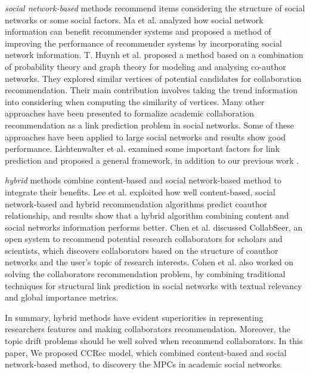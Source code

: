 \documentclass[review]{elsarticle}
\begin{document}
\emph{social network-based} methods recommend items considering the structure of social networks or some social factors. Ma et al. \cite{ma2011recommender} analyzed how social network information can benefit recommender systems and proposed a method of improving the performance of recommender systems by incorporating social network information. T. Huynh et al. \cite{huynh2013trend} proposed a method based on a combination of probability theory and graph theory for modeling and analysing co-author networks. They explored similar vertices of potential candidates for collaboration recommendation. Their main contribution involves taking the trend information into considering when computing the similarity of vertices. Many other approaches have been presented to formalize academic collaboration recommendation as a link prediction problem \cite{chen2012discovering} \cite{sun2011co} in social networks. Some of these approaches have been applied to large social networks and results show good performance. Lichtenwalter et al. \cite{lichtenwalter2010new} examined some important factors for link prediction and proposed a general framework, in addition to our previous work \cite{li2014acrec}.

\emph{hybrid} methods combine content-based and social network-based method to integrate their benefits. Lee et al. \cite{lee2011recommending} exploited how well content-based, social network-based and hybrid recommendation algorithms predict coauthor relationship, and results show that a hybrid algorithm combining content and social networks information performs better. Chen et al. \cite{chen2011collabseer} discussed CollabSeer, an open system to recommend potential research collaborators for scholars and scientists, which discovers collaborators based on the structure of coauthor networks and the user's topic of research interests. Cohen et al. \cite{cohen2013recommending} also worked on solving the collaborators recommendation problem, by combining traditional techniques for structural link prediction in social networks with textual relevancy and global importance metrics.

In summary, hybrid methods have evident superiorities in representing researchers features and making collaborators recommendation. Moreover, the topic drift problems should be well solved when recommend collaborators. In this paper, We proposed CCRec model, which combined content-based and social network-based method, to discovery the MPCs in academic social networks.
\end{document}
